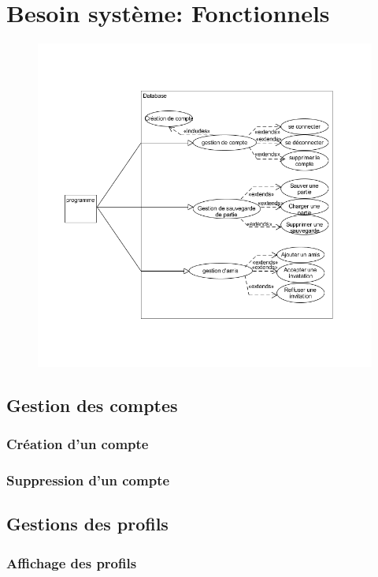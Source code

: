 \documentclass[utf8]{article}
\begin{document}
\newpage
\section{Besoin système: Fonctionnels}

\begin{figure}[H]
  \centering
  \includegraphics[scale=0.6]{img/DatabaseUseCase.png}
\end{figure}

  \subsection{Gestion des comptes}
    \subsubsection{Création d'un compte}
    \subsubsection{Suppression d'un compte}
  \subsection{Gestions des profils}
    \subsubsection{Affichage des profils}
\end{document}
